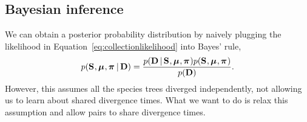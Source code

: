 \subsection{Bayesian inference}

We can obtain a posterior probability distribution by naively plugging the
likelihood in Equation~\ref{eq:collectionlikelihood} into Bayes' rule,
\begin{equation}
    p(
    \mathbf{S}_{},
    \boldsymbol{\mu}_{},
    \boldsymbol{\pi}_{}
    \,|\,
    \mathbf{D}
    )
    =
    \frac{
        p(
        \mathbf{D}
        \,|\,
        \mathbf{S}_{}, \boldsymbol{\mu}_{}, \boldsymbol{\pi}_{}
        )
        p(
        \mathbf{S}_{},
        \boldsymbol{\mu}_{},
        \boldsymbol{\pi}_{}
        )
    }{
        p(
        \mathbf{D}
        )
    }.
    \label{eq:collectionindependentbayesrule}
\end{equation}
However, this assumes all the species trees diverged independently, not
allowing us to learn about shared divergence times.
What we want to do is relax this assumption and allow pairs to share divergence
times.

